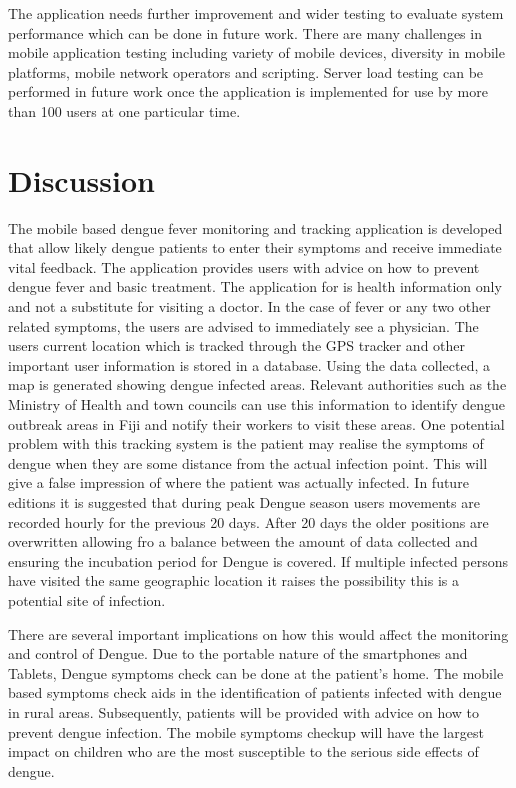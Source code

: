 \documentclass[runningheads,a4paper]{llncs}
\begin{document}
The application needs further improvement  and wider testing to evaluate system performance which can be done in future work. There are many challenges in mobile application testing including variety of mobile devices, diversity in mobile platforms, mobile network operators and scripting. Server load testing can be performed in future work once the application is implemented for use by more than 100 users at one particular time. 
  

\section{Discussion}
The mobile based dengue fever monitoring and tracking application is developed that allow likely dengue patients to enter their symptoms and receive immediate vital feedback. The application provides users with advice on how to prevent dengue fever and basic treatment. The application for is health information only and not a substitute for visiting a doctor. In the case of fever or any two other related symptoms, the users are advised to immediately see a physician. The users current location which is tracked through the GPS tracker and other important user information is stored in a database. Using the data collected, a map is generated showing dengue infected areas. Relevant authorities such as the Ministry of Health and town councils can use this information to identify dengue outbreak areas in Fiji and notify their workers to visit these areas.  One potential problem with this tracking system is the patient may realise the symptoms of dengue when they are some distance from the actual infection point. This will give a false impression of where the patient was actually infected. In future editions it is suggested that during peak Dengue season users movements are recorded hourly for the previous 20 days.  After 20 days the older positions are overwritten allowing fro a balance between the amount of data collected and ensuring the incubation period for Dengue is covered. If multiple infected persons have visited the same geographic location it raises the possibility this is a potential site of infection.

There are several important implications on how this would affect the monitoring and control of Dengue. Due to the portable nature of the smartphones and Tablets, Dengue symptoms check can be done at the patient’s home. The mobile based symptoms check aids in the identification of patients infected with dengue in rural areas. Subsequently, patients will be provided with advice on how to prevent dengue infection. The mobile symptoms checkup will have the largest impact on children who are the most susceptible to the serious side effects of dengue.
\end{document}
